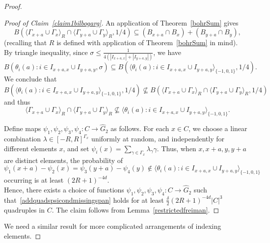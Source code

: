 \documentclass[a4paper,11pt]{article}
\numberwithin{theorem}{section}
\theoremstyle{definition}
\begin{document}
\begin{proof}
    \begin{proof}[Proof of Claim~\ref{claim1bilbogarg}]
        An application of Theorem~\ref{bohrSum} gives
        \[B(\langle \Gamma_{x + a} \cup \Gamma_x\rangle_R \cap \langle \Gamma_{y + a} \cup \Gamma_y\rangle_R, 1/4) \subseteq (B_{x + a} \cap B_x) + (B_{y + a} \cap B_y),\]
        (recalling that $R$ is defined with application of Theorem~\ref{bohrSum} in mind).\\
        
        By triangle inequality, since $\sigma \leq \frac{1}{4 (|I_{x + a, x}| + |I_{y + a, y}|)}$, we have
        \[B(\theta_i(a) : i \in I_{x + a, x} \cup I_{y + a, y}, \sigma) \subseteq B(\langle \theta_i(a) : i \in I_{x + a, x} \cup I_{y + a, y}\rangle_{\{-1,0,1\}}, 1/4).\]
        We conclude that 
        \[B(\langle \theta_i(a) : i \in I_{x + a, x} \cup I_{y + a, y}\rangle_{\{-1,0,1\}}, 1/4) \not\subseteq B(\langle \Gamma_{x + a} \cup \Gamma_x\rangle_R \cap \langle \Gamma_{y + a} \cup \Gamma_y\rangle_R, 1/4)\]
        and thus
        \[\langle \Gamma_{x + a} \cup \Gamma_x\rangle_R \cap \langle \Gamma_{y + a} \cup \Gamma_y\rangle_R \not\subseteq \langle \theta_i(a) : i \in I_{x + a, x} \cup I_{y + a, y}\rangle_{\{-1,0,1\}}.\]

        Define maps $\psi_1, \psi_2, \psi_3, \psi_4 : C \to \hat{G}_2$ as follows. For each $x \in C$, we choose a linear combination $\lambda \in [-R, R]^{\Gamma_x}$ uniformly at random, and independently for different elements $x$, and set $\psi_i(x) = \sum_{\gamma \in \Gamma_x} \lambda_\gamma \gamma$. Thus, when $x, x+a, y, y+a$ are distinct elements, the probability of 
        \begin{equation}\psi_1(x + a) - \psi_2(x) = \psi_3(y + a) - \psi_4(y) \notin \langle\theta_i(a) : i \in I_{x + a, x} \cup I_{y + a, y}\rangle_{\{-1,0,1\}}\label{addquadspsicondmissingspan}\end{equation}
        occurring is at least $(2R+1)^{-4d}$.\\

        Hence, there exists a choice of functions $\psi_1, \psi_2, \psi_3, \psi_4 : C \to \hat{G}_2$ such that~\eqref{addquadspsicondmissingspan} holds for at least $\frac{\delta}{2}(2R+1)^{-4d}|C|^3$ quadruples in $C$. The claim follows from Lemma~\ref{restrictedfreiman}.
    \end{proof}

    We need a similar result for more complicated arrangements of indexing elements.


\end{proof}
\end{document}
